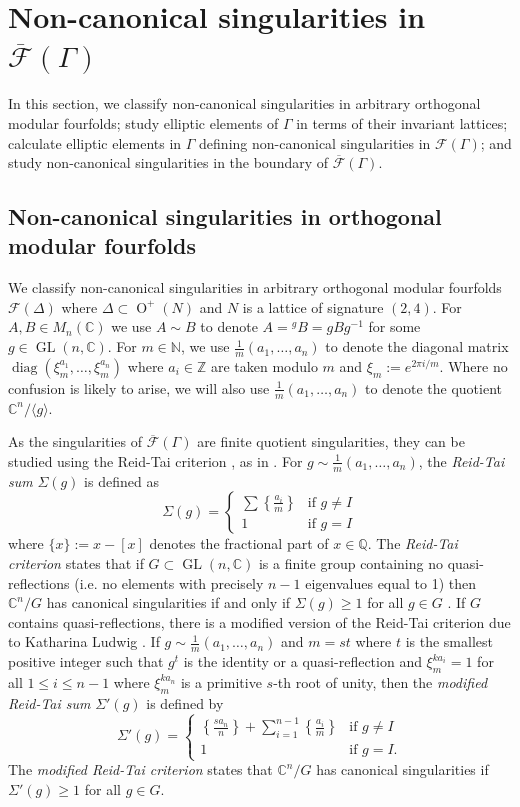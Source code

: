 \documentclass[12pt, a4paper]{article}
\newcommand{\CC}{\mathbb{C}}
\newcommand{\ZZ}{\mathbb{Z}}
\newcommand{\QQ}{\mathbb{Q}}
\newcommand{\NN}{\mathbb{N}}
\newcommand{\la}{\langle}
\newcommand{\ra}{\rangle}
\newcommand{\fc}{\mathcal{F}}
\newcommand{\opn}{\operatorname}
\begin{document}
 \section{Non-canonical singularities in $\overline{\fc}(\Gamma)$}\label{SingsSec}
In this section, 
we classify non-canonical singularities in arbitrary orthogonal modular fourfolds; 
study elliptic elements of $\Gamma$ in terms of their invariant lattices;
calculate elliptic elements in $\Gamma$ defining non-canonical singularities in $\fc(\Gamma)$;
and study non-canonical singularities in the boundary of $\overline{\fc}(\Gamma)$.
\subsection{Non-canonical singularities in orthogonal modular fourfolds}
We classify non-canonical singularities in arbitrary orthogonal modular fourfolds $\fc(\Delta)$ where $\Delta \subset \opn{O}^+(N)$ and $N$ is a lattice of signature $(2,4)$.
For $A, B \in M_n(\CC)$ we use $A \sim B$ to denote $A={}^gB=gBg^{-1}$ for some $g \in \opn{GL}(n, \CC)$.
For $m \in \NN$, we use $\frac{1}{m}(a_1, \ldots, a_n)$ to denote the diagonal matrix $\opn{diag}(\xi_m^{a_1}, \ldots, \xi_m^{a_n})$  where
$a_i \in \ZZ$  are taken modulo $m$ and
$\xi_m:=e^{2 \pi i / m}$.
Where no confusion is likely to arise, we will also use $\frac{1}{m}(a_1, \ldots, a_n)$ to denote the quotient $\CC^n / \la g \ra$.

As the singularities of $\overline{\fc}(\Gamma)$ are finite quotient singularities, they can be studied using the Reid-Tai criterion \cite{YPG, Tai}, as in \cite{Kondo, GHSK3}.
For $g \sim \frac{1}{m}(a_1, \ldots, a_n)$, the \emph{Reid-Tai sum} $\Sigma(g)$ is defined as
\[
\Sigma(g) =
\begin{cases}
  \sum \left \{ \frac{a_i}{m} \right \} & \text{if $g \neq I$} \\
  1 & \text{if $g=I$}
\end{cases}
\]
where $\{ x \} := x - [x]$ denotes the fractional part of $x \in \QQ$.
The \emph{Reid-Tai criterion} states that if $G \subset \opn{GL}(n, \CC)$ is a finite group containing no quasi-reflections (i.e. no elements with precisely $n-1$ eigenvalues equal to 1) then $\CC^n / G$ has canonical singularities \cite{YPG} if and only if $\Sigma(g) \geq 1$ for all $g \in G$ \cite{ReidCanonical3-folds, YPG,  Tai}. 
If $G$ contains quasi-reflections, there is a modified version of the Reid-Tai criterion due to Katharina Ludwig \cite[Proposition 5.24]{Handbook}.
If $g \sim \frac{1}{m}(a_1, \ldots, a_n)$ and $m=st$ where $t$ is the smallest positive integer such that $g^t$ is the identity or a quasi-reflection and $\xi_m^{k a_i}=1$ for all $1 \leq i \leq n-1$ where $\xi_m^{k a_n}$ is a primitive $s$-th root of unity, then the \emph{modified Reid-Tai sum} $\Sigma'(g)$ is defined by
\[
\Sigma'(g) =
\begin{cases}
  \left \{ \frac{s a_n}{n} \right \} + \sum_{i=1}^{n-1} \left \{ \frac{a_i}{m} \right \} & \text{if $g \neq I$} \\
  1 & \text{if $g=I$.}
\end{cases}
\]
The \emph{modified Reid-Tai criterion} states that $\CC^n / G$ has canonical singularities if $\Sigma'(g) \geq 1$ for all $g \in G$.
\end{document}
